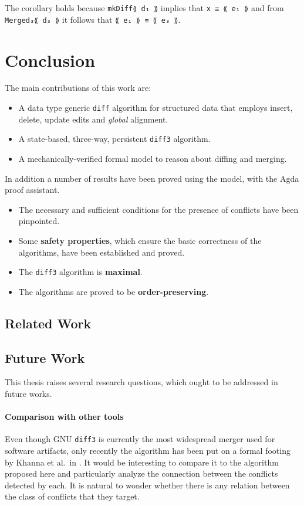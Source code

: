 \documentclass[../Thesis.tex]{subfiles}
\begin{document}
	The corollary holds because \texttt{mkDiff⟪ d₁ ⟫} implies that
	\texttt{x ≡ ⟪ e₁ ⟫} and from \texttt{Merged₃⟪ d₃ ⟫} it follows
	that \texttt{⟪ e₁ ⟫ ≡ ⟪ e₃ ⟫}.
	
\section{Conclusion}
The main contributions of this work are:
\begin{itemize}
	\item A data type generic \texttt{diff} algorithm for structured
			data that employs insert, delete, update edits and \emph{global} 
			alignment.
	\item A state-based, three-way, persistent \texttt{diff3} algorithm.
	\item A mechanically-verified formal model to reason about diffing 
				and merging.
\end{itemize}

In addition a number of results have been proved using the model, with
the Agda proof assistant.
\begin{itemize}
	\item The necessary and sufficient conditions for the presence of conflicts 
	have been pinpointed.
	\item Some \textbf{safety properties}, which ensure the basic correctness 
	of the algorithms, have been established and proved.
	\item The \texttt{diff3} algorithm is \textbf{maximal}.
	\item The algorithms are proved to be \textbf{order-preserving}.
\end{itemize}

	\subsection{Related Work}
	
	\subsection{Future Work}	
	This thesis raises several research questions, which ought to be 
	addressed in future works.
	
	\paragraph{Comparison with other tools}
	Even though GNU \texttt{diff3} is currently the most widespread merger 
	used for software artifacts, only recently the algorithm has been put on a 
	formal footing by Khanna et al.\ in \cite{PierceDiff3}.
	It would be interesting to compare it to the algorithm proposed here
	and particularly analyze the connection between the conflicts detected
	by each. It is natural to wonder whether there is any relation between
	the class of conflicts that they target. 
	
\end{document}
